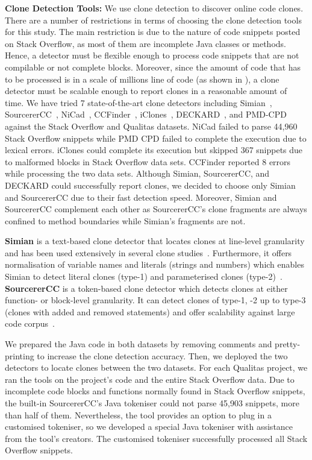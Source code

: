 \documentclass[10pt,journal,compsoc]{IEEEtran}
\begin{document}
\textbf{Clone Detection Tools: } We use clone detection to discover online code
clones. %
There are a number of restrictions in terms of choosing the clone detection
tools for this study. The main restriction is due to the nature of code snippets
posted on Stack Overflow, as most of them are incomplete Java classes or
methods. Hence, a detector must be flexible enough to process code snippets that
are not compilable or not complete blocks. Moreover, since the amount of code
that has to be processed is in a scale of millions line of code (as shown in
), a clone detector must be scalable enough to report clones
in a reasonable amount of time. We have tried 7 state-of-the-art clone detectors
including Simian~\cite{simian}, SourcererCC~\cite{Sajnani2016},
NiCad~\cite{Cordy,Roy2008}, CCFinder~\cite{Kamiya2002}, iClones~\cite{Gode2009},
DECKARD~\cite{Jiang2007a}, and PMD-CPD~\cite{pmd-cpd} against the Stack Overflow
and Qualitas datasets. NiCad failed to parse 44,960 Stack Overflow snippets
while PMD CPD failed to complete the execution due to lexical errors. iClones
could complete its execution but skipped 367 snippets due to malformed blocks in
Stack Overflow data sets. CCFinder reported 8 errors while processing the two data sets. 
Although Simian, SourcererCC, and DECKARD
could successfully report clones, we decided to choose only Simian and
SourcererCC due to their fast detection speed. Moreover, Simian and
SourcererCC complement each other as SourcererCC's clone fragments are
always confined to method boundaries while Simian's fragments are not.

\textbf{Simian} is a text-based clone detector that locates clones at line-level
granularity and has been used extensively in several clone
studies~\cite{Ragkhitwetsagul2016, emse, Wang2013, Mondal2011, Cheung2015,
	Krinke2010}. Furthermore, it offers normalisation of variable names and literals
(strings and numbers) which enables Simian to detect literal clones (type-1) and
parameterised clones (type-2)~\cite{Bellon2007}. \textbf{SourcererCC} is a token-based clone
detector which detects clones at either function- or block-level granularity. It
can detect clones of type-1, -2 up to type-3 (clones with added and removed
statements) and offer scalability against large code
corpus~\cite{Sajnani2016,Saini2016,Yang2017}. 

We prepared the Java code in both datasets by removing comments and
pretty-printing to increase the clone detection accuracy. Then, we deployed the
two detectors to locate clones between the two datasets.  For each Qualitas
project, we ran the tools on the project's code and the entire Stack Overflow
data. Due to incomplete code blocks and functions
normally found in Stack Overflow snippets, the built-in SourcererCC's Java
tokeniser could not parse 45,903 snippets, more than half of them. Nevertheless,
the tool provides an option to plug in a customised tokeniser, so we developed a
special Java tokeniser with assistance from the tool's creators. The customised
tokeniser successfully processed all Stack Overflow snippets.
\end{document}
